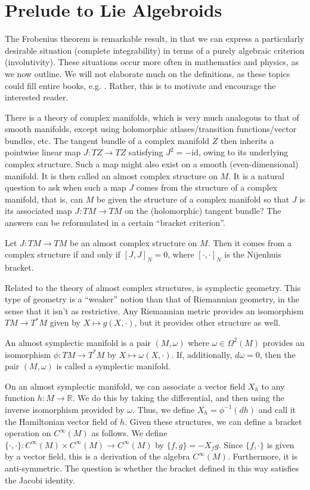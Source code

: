 \section{Prelude to Lie Algebroids}

The Frobenius theorem is remarkable result, in that we can express a particularly desirable situation (complete integrability) in terms of a purely algebraic criterion (involutivity). These situations occur more often in mathematics and physics, as we now outline. We will not elaborate much on the definitions, as these topics could fill entire books, e.g. \cite{Crainic_2021}. Rather, this is to motivate and encourage the interested reader.\par
There is a theory of complex manifolds, which is very much analogous to that of smooth manifolds, except using holomorphic atlases/transition functions/vector bundles, etc. The tangent bundle of a complex manifold $Z$ then inherits a pointwise linear map $J:TZ\to TZ$ satisfying $J^2=-\text{id}$, owing to its underlying complex structure. Such a map might also exist on a smooth (even-dimensional) manifold. It is then called an almost complex structure on $M$. It is a natural question to ask when such a map $J$ comes from the structure of a complex manifold, that is, can $M$ be given the structure of a complex manifold so that $J$ is its associated map $J:TM\to TM$ on the (holomorphic) tangent bundle? The answers can be reformulated in a certain ``bracket criterion''.
\begin{theorem}
  Let $J:TM\to TM$ be an almost complex structure on $M$. Then it comes from a complex structure if and only if $[J,J]_N=0$, where $[\cdot,\cdot]_N$ is the Nijenhuis bracket.
\end{theorem}
Related to the theory of almost complex structures, is symplectic geometry. This type of geometry is a ``weaker'' notion than that of Riemannian geometry, in the sense that it isn't as restrictive. Any Riemannian metric provides an isomorphism $TM\to T^*M$ given by $X\mapsto g(X,\cdot)$, but it provides other structure as well.
\begin{definition}
  An almost symplectic manifold is a pair $(M,\omega)$ where $\omega\in\Omega^2(M)$ provides an isomorphism $\phi:TM\to T^*M$ by $X\mapsto \omega(X,\cdot)$. If, additionally, $d\omega=0$, then the pair $(M,\omega)$ is called a symplectic manifold.
\end{definition}
On an almost symplectic manifold, we can associate a vector field $X_h$ to any function $h:M\to\mathbb{R}$. We do this by taking the differential, and then using the inverse isomorphism provided by $\omega$. Thus, we define $X_h=\phi^{-1}(dh)$ and call it the Hamiltonian vector field of $h$. Given these structures, we can define a bracket operation on $C^\infty(M)$ as follows. We define $\{\cdot,\cdot\}:C^\infty(M)\times C^\infty(M)\to C^\infty(M)$ by $\{f,g\}=-X_fg$. Since $\{f,\cdot\}$ is given by a vector field, this is a derivation of the algebra $C^\infty(M)$. Furthermore, it is anti-symmetric. The question is whether the bracket defined in this way satisfies the Jacobi identity.
